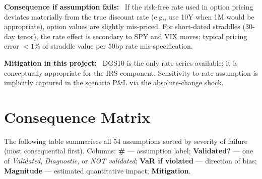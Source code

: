 \documentclass[11pt,a4paper]{article}
\newcommand{\asmfield}[1]{\medskip\noindent\textbf{#1:}\ }
\begin{document}
\asmfield{Consequence if assumption fails}
If the risk-free rate used in option pricing deviates materially from the
true discount rate (e.g., use 10Y when 1M would be appropriate), option
values are slightly mis-priced. For short-dated straddles (30-day tenor),
the rate effect is secondary to SPY and VIX moves; typical pricing error
$< 1\%$ of straddle value per 50bp rate mis-specification.

\asmfield{Mitigation in this project}
DGS10 is the only rate series available; it is conceptually appropriate
for the IRS component. Sensitivity to rate assumption is implicitly
captured in the scenario P\&L via the absolute-change shock.

\section{Consequence Matrix}\label{sec:consequence-matrix}

The following table summarises all 54 assumptions sorted by severity of
failure (most consequential first). Columns: \textbf{\#} --- assumption
label; \textbf{Validated?} --- one of \emph{Validated}, \emph{Diagnostic},
or \emph{NOT validated}; \textbf{VaR if violated} --- direction of bias;
\textbf{Magnitude} --- estimated quantitative impact; \textbf{Mitigation}.
\end{document}
